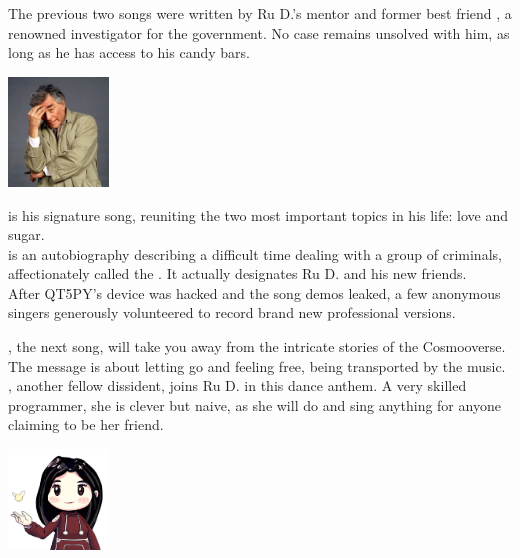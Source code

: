 
The previous two songs were written by Ru D.'s mentor and former best friend , a renowned investigator for the government. No case remains unsolved with him, as long as he has access to his candy bars. 

\begin{center}
\includegraphics[width=0.20\textwidth]{Assets/cutie-spy-placeholder}
\end{center}

 is his signature song, reuniting the two most important topics in his life: love and sugar.\\

 is an autobiography describing a difficult time dealing with a group of criminals, affectionately called the . It actually designates Ru D. and his new friends. \\

After QT5PY's device was hacked and the song demos leaked, a few anonymous singers generously volunteered to record brand new professional versions.

\clearpage

, the next song, will take you away from the intricate stories of the Cosmooverse. The message is about letting go and feeling free, being transported by the music.\\

, another fellow dissident, joins Ru D. in this dance anthem. A very skilled programmer, she is clever but naive, as she will do and sing anything for anyone claiming to be her friend. 

\begin{center}
\includegraphics[width=0.20\textwidth]{Assets/florrie-head}
\end{center}

\clearpage